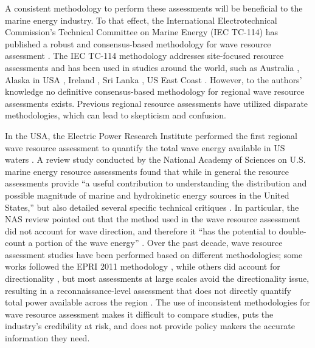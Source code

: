 A consistent methodology to perform these assessments will be beneficial to the marine energy industry. To that effect, the International Electrotechnical Commission's Technical Committee on Marine Energy (IEC TC-114) has published a robust and consensus-based methodology for wave resource assessment \citep[][hereafter, 62600-101]{internationalelectrotechnicalcommissionPart101Wave2015}. The IEC TC-114 methodology addresses site-focused resource assessments and has been used in studies around the world, such as Australia \citep{hemerRevisedAssessmentAustralia2017}, Alaska in USA \citep{garciamedinaWaveResourceCharacterization2021}, Ireland \citep{ramosExploringUtilityEffectiveness2016}, Sri Lanka \citep{lokuliyanaSriLankanWave2020}, US East Coast \citep{ahnNearshoreWaveEnergy2021}. However, to the authors’ knowledge no definitive consensus-based methodology for regional wave resource assessments exists. Previous regional resource assessments have utilized disparate methodologies, which can lead to skepticism and confusion. 

In the USA, the Electric Power Research Institute performed the first regional wave resource assessment to quantify the total wave energy available in US waters \citep[][hereafter, EPRI 2011]{EPRIwaveresource2011}. A review study conducted by the National Academy of Sciences on U.S. marine energy resource assessments found that while in general the resource assessments provide “a useful contribution to understanding the distribution and possible magnitude of marine and hydrokinetic energy sources in the United States,” but also detailed several specific technical critiques \citep{nationalresearchcouncilEvaluationDepartmentEnergy2013}. In particular, the NAS review pointed out that the method used in the wave resource assessment did not account for wave direction, and therefore it “has the potential to double-count a portion of the wave energy” \citep{nationalresearchcouncilEvaluationDepartmentEnergy2013}. Over the past decade, wave resource assessment studies have been performed based on different methodologies; some works followed the EPRI 2011 methodology \citep[e.g., ][]{kumarWaveEnergyResource2015}, while others did account for directionality \citep{gunnQuantifyingGlobalWave2012, regueroGlobalWavePower2015}, but most assessments at large scales avoid the directionality issue, resulting in a reconnaissance-level assessment that does not directly quantify total power available across the region \citep{iglesiasWaveEnergyPotential2009, neillWavePowerVariability2013, sierraWaveEnergyResource2013, robertsonCharacterizingShoreWave2014, alonsoWaveEnergyResource2015, zhengAssessingChinaSea2013}. The use of inconsistent methodologies for wave resource assessment makes it difficult to compare studies, puts the industry’s credibility at risk, and does not provide policy makers the accurate information they need. 

